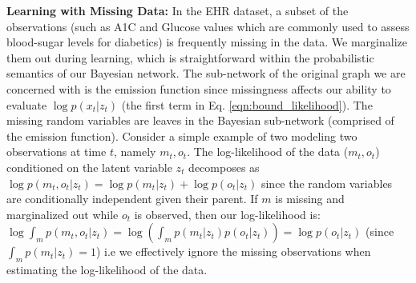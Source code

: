 \documentclass[letterpaper]{article}
\theoremstyle{plain}
\begin{document}
{\textbf{Learning with Missing Data: }
In the EHR dataset, a subset of the observations (such as A1C and Glucose
values which are commonly used to assess blood-sugar levels for diabetics) is frequently missing in the data. We marginalize them 
out during learning, which is straightforward within the probabilistic semantics of our Bayesian network. 
The sub-network of the original graph we are concerned with is the emission function since missingness affects our ability 
to evaluate $\log p(x_t|z_t)$ (the first term in Eq. \ref{eqn:bound_likelihood}). 
The missing random variables are leaves in the Bayesian sub-network (comprised of the emission function).  
Consider a simple example of two modeling two observations
at time $t$, namely $m_t,o_t$. The log-likelihood of the data ($m_t,o_t$) conditioned 
on the latent variable $z_t$ decomposes as $\log p(m_t,o_t|z_t) = \log p(m_t|z_t)+ \log p(o_t|z_t)$
since the random variables are conditionally independent given their parent. 
If $m$ is missing and marginalized out while $o_t$ is observed, then
our log-likelihood is: $\log \int_m p(m_t, o_t|z_t)  = \log (\int_m p(m_t|z_t) p(o_t|z_t) ) = \log p(o_t|z_t)$ (since $\int_m p(m_t|z_t) = 1$) 
i.e we effectively ignore the missing observations when estimating the log-likelihood of the data. 

}
\end{document}
